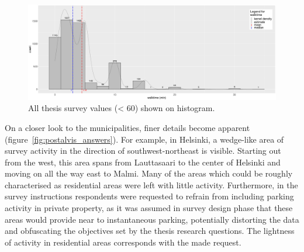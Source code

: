 \begin{figure}[H]%
    \centering
    \includegraphics[width=\textwidth]{images/hist_pmax59-wmax59_walktime-likert_binw2_23-09-2020.png}
    \caption[Histogram, walk to destination]{All thesis survey  values (< 60) shown on histogram.}%
    \label{fig:walktime_hist}%
\end{figure}

On a closer look to the municipalities, finer details become apparent (figure~\ref{fig:postalvis_answers}). For example, in Helsinki, a wedge-like area of survey activity in the direction of southwest-northeast is visible. Starting out from the west, this area spans from Lauttasaari to the center of Helsinki and moving on all the way east to Malmi. Many of the areas which could be roughly characterised as residential areas were left with little activity. Furthermore, in the survey instructions respondents were requested to refrain from including parking activity in private property, as it was assumed in survey design phase that these areas would provide near to instantaneous parking, potentially distorting the data and obfuscating the objectives set by the thesis research questions. The lightness of activity in residential areas corresponds with the made request.

